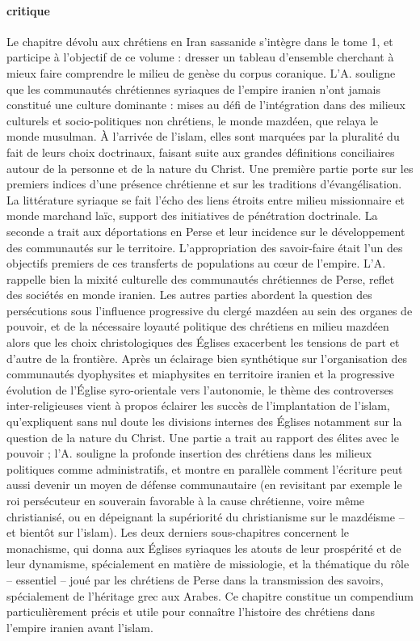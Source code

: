 \paragraph{critique} \label{ChretienEnPerse} Le chapitre dévolu aux chrétiens en Iran sassanide s’intègre dans le tome 1, et participe à l’objectif de ce volume : dresser un tableau d’ensemble cherchant à mieux faire comprendre le milieu de genèse du corpus coranique. L’A. souligne que les communautés chrétiennes syriaques de l’empire iranien n’ont jamais constitué une culture dominante : mises au défi de l’intégration dans des milieux culturels et socio-politiques non chrétiens, le monde mazdéen, que relaya le monde musulman. À l’arrivée de l’islam, elles sont marquées par la pluralité du fait de leurs choix doctrinaux, faisant suite aux grandes définitions conciliaires autour de la personne et de la nature du Christ. Une première partie porte sur les premiers indices d’une présence chrétienne et sur les traditions d’évangélisation. La littérature syriaque se fait l’écho des liens étroits entre milieu missionnaire et monde marchand laïc, support des initiatives de pénétration doctrinale. La seconde a trait aux déportations en Perse et leur incidence sur le développement des communautés sur le territoire. L’appropriation des savoir-faire était l’un des objectifs premiers de ces transferts de populations au cœur de l’empire. L’A. rappelle bien la mixité culturelle des communautés chrétiennes de Perse, reflet des sociétés en monde iranien. Les autres parties abordent la question des persécutions sous l’influence progressive du clergé mazdéen au sein des organes de pouvoir, et de la nécessaire loyauté politique des chrétiens en milieu mazdéen alors que les choix christologiques des Églises exacerbent les tensions de part et d’autre de la frontière. Après un éclairage bien synthétique sur l’organisation des communautés dyophysites et miaphysites en territoire iranien et la progressive évolution de l’Église syro-orientale vers l’autonomie, le thème des controverses inter-religieuses vient à propos éclairer les succès de l’implantation de l’islam, qu’expliquent sans nul doute les divisions internes des Églises notamment sur la question de la nature du Christ. Une partie a trait au rapport des élites avec le pouvoir ; l’A. souligne la profonde insertion des chrétiens dans les milieux politiques comme administratifs, et montre en parallèle comment l’écriture peut aussi devenir un moyen de défense communautaire (en revisitant par exemple le roi persécuteur en souverain favorable à la cause chrétienne, voire même christianisé, ou en dépeignant la supériorité du christianisme sur le mazdéisme – et bientôt sur l’islam). Les deux derniers sous-chapitres concernent le monachisme, qui donna aux Églises syriaques les atouts de leur prospérité et de leur dynamisme, spécialement en matière de missiologie, et la thématique du rôle – essentiel – joué par les chrétiens de Perse dans la transmission des savoirs, spécialement de l’héritage grec aux Arabes. Ce chapitre constitue un compendium particulièrement précis et utile pour connaître l’histoire des chrétiens dans l’empire iranien avant l’islam.


